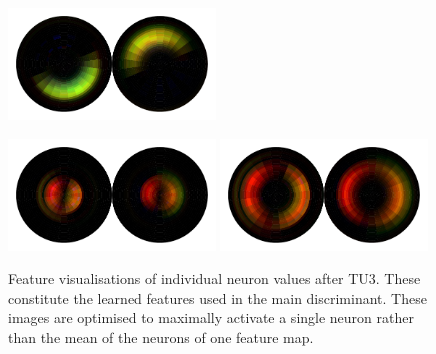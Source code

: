 \begin{figure}[h!]
\begin{center}
        \includegraphics[width=0.49\textwidth]{figures/appendix_featurevis/TU3_2_2_1.pdf}
    \end{center}
    \begin{center}
        \includegraphics[width=0.49\textwidth]{figures/appendix_featurevis/TU3_6_1_0.pdf}
        \includegraphics[width=0.49\textwidth]{figures/appendix_featurevis/TU3_6_1_1.pdf}
    \end{center}
    \caption{Feature visualisations of individual neuron values after TU3. These constitute the learned features used in the main discriminant.
             These images are optimised to maximally activate a single neuron rather than the mean of the neurons of one feature map.}
\end{figure}


